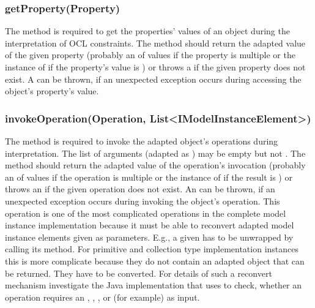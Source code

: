 \subsubsection{getProperty(Property)}

The method  is required to get the properties' values of an object during the interpretation of \acs{OCL} constraints. The method should return the adapted value of the given property (probably an  of values if the property is multiple or the instance of  if the property's value is ) or throws a  if the given property does not exist. A  can be thrown, if an unexpected exception occurs during accessing the object's property's value.

\subsubsection{invokeOperation(Operation, List<IModelInstanceElement>)}
			
The method  is required to invoke the adapted object's operations during interpretation. The list of arguments (adapted as ) may be empty but not . The method should return the adapted value of the operation's invocation (probably an  of values if the operation is multiple or the instance of  if the result is ) or throws an  if the given operation does not exist. An  can be thrown, if an unexpected exception occurs during invoking the object's operation. This operation is one of the most complicated operations in the complete model instance implementation because it must be able to reconvert adapted model instance elements given as parameters. E.g., a given  has to be unwrapped by calling its  method. For primitive and collection type implementation instances this is more complicate because they do not contain an adapted object that can be returned. They have to be converted. For details of such a reconvert mechanism investigate the Java implementation that uses  to check, whether an operation requires an , , , or  (for example) as input.


